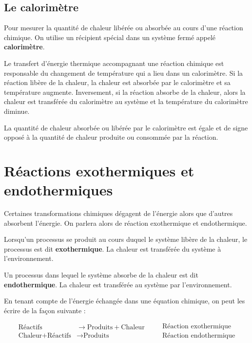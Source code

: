 \documentclass[
  11pt,
  a4paper,
  openany]{book}
\begin{document}
\subsection{Le calorimètre}\label{le-calorimuxe8tre}

Pour mesurer la quantité de chaleur libérée ou absorbée au cours d'une réaction chimique. On utilise un récipient spécial dans un système fermé appelé \textbf{calorimètre}.

Le transfert d'énergie thermique accompagnant une réaction chimique est responsable du changement de température qui a lieu dans un calorimètre. Si la réaction libère de la chaleur, la chaleur est absorbée par le calorimètre et sa température augmente. Inversement, si la réaction absorbe de la chaleur, alors la chaleur est transférée du calorimètre au système et la température du calorimètre diminue.

La quantité de chaleur absorbée ou libérée par le calorimètre est égale et de signe opposé à la quantité de chaleur produite ou consommée par la réaction.

\clearpage

\section{Réactions exothermiques et endothermiques}\label{ruxe9actions-exothermiques-et-endothermiques}

Certaines transformations chimiques dégagent de l'énergie alors que d'autres absorbent l'énergie. On parlera alors de réaction exothermique et endothermique.

Lorsqu'un processus se produit au cours duquel le système libère de la chaleur, le processus est dit \textbf{exothermique}. La chaleur est transférée du système à l'environnement.

Un processus dans lequel le système absorbe de la chaleur est dit \textbf{endothermique}. La chaleur est transférée au système par l'environnement.

En tenant compte de l'énergie échangée dans une équation chimique, on peut les écrire de la façon suivante :

\[
\begin{split}
  \text{Réactifs} & \rightarrow \text{Produits} + \text{Chaleur} \\
  \text{Chaleur} + \text{Réactifs} & \rightarrow \text{Produits}
\end{split}
\quad
\begin{split}
  &\text{Réaction exothermique} \\
  &\text{Réaction endothermique}
\end{split}
\]
\end{document}
